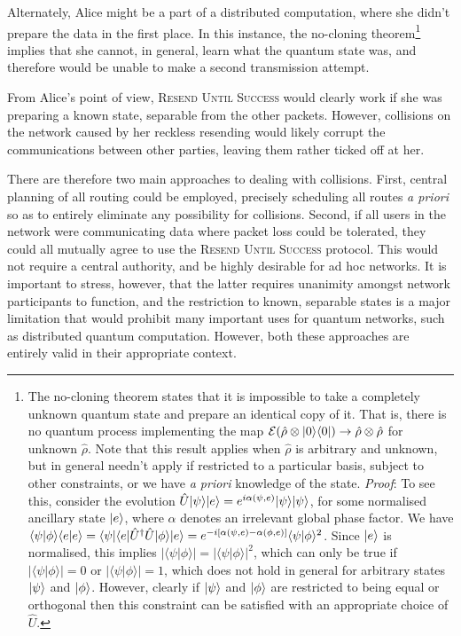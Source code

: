 Alternately, Alice might be a part of a distributed computation, where she didn't prepare the data in the first place. In this instance, the no-cloning theorem\footnote{The no-cloning theorem states that it is impossible to take a completely unknown quantum state and prepare an identical copy of it. That is, there is no quantum process implementing the map \mbox{$\mathcal{E}(\hat\rho\otimes|0\rangle\langle0|) \to \hat\rho\otimes\hat\rho$} for unknown $\hat\rho$. Note that this result applies when $\hat\rho$ is arbitrary and unknown, but in general needn't apply if restricted to a particular basis, subject to other constraints, or we have \textit{a priori} knowledge of the state. \textit{Proof}: To see this, consider the evolution \mbox{$\hat{U}|\psi\rangle|e\rangle = e^{i\alpha(\psi,e)}|\psi\rangle|\psi\rangle$}, for some normalised ancillary state $|e\rangle$, where $\alpha$ denotes an irrelevant global phase factor. We have \mbox{$\langle\psi|\phi\rangle\langle e|e\rangle = \langle\psi|\langle e|\hat{U}^\dag\hat{U}|\phi\rangle|e\rangle = e^{-i[\alpha(\psi,e)-\alpha(\phi,e)]} \langle\psi|\phi\rangle^2$}. Since $|e\rangle$ is normalised, this implies \mbox{$|\langle\psi|\phi\rangle| = |\langle\psi|\phi\rangle|^2$}, which can only be true if \mbox{$ |\langle\psi|\phi\rangle|=0$} or \mbox{$ |\langle\psi|\phi\rangle|=1$}, which does not hold in general for arbitrary states $|\psi\rangle$ and $|\phi\rangle$. However, clearly if $|\psi\rangle$ and $|\phi\rangle$ are restricted to being equal or orthogonal then this constraint can be satisfied with an appropriate choice of $\hat{U}$.} implies that she cannot, in general, learn what the quantum state was, and therefore would be unable to make a second transmission attempt.

From Alice's point of view, \textsc{Resend Until Success} would clearly work if she was preparing a known state, separable from the other packets. However, collisions on the network caused by her reckless resending would likely corrupt the communications between other parties, leaving them rather ticked off at her.

There are therefore two main approaches to dealing with collisions. First, central planning of all routing could be employed, precisely scheduling all routes \textit{a priori} so as to entirely eliminate any possibility for collisions. Second, if all users in the network were communicating data where packet loss could be tolerated, they could all mutually agree to use the \textsc{Resend Until Success} protocol. This would not require a central authority, and be highly desirable for ad hoc networks. It is important to stress, however, that the latter requires unanimity amongst network participants to function, and the restriction to known, separable states is a major limitation that would prohibit many important uses for quantum networks, such as distributed quantum computation. However, both these approaches are entirely valid in their appropriate context.

